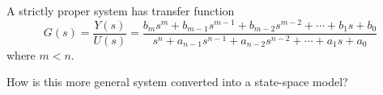 A strictly proper system has transfer function
\[G(s)=\frac{Y(s)}{U(s)} = \frac{b_ms^m +
b_{m-1}s^{m-1}+b_{m-2}s^{m-2}+\cdots+b_1s+b_0}{s^n +
a_{n-1}s^{n-1}+a_{n-2}s^{n-2}+\cdots+a_1s+a_0}\] where $m<n$.

How is this more general system converted into a state-space model?
\endinput

